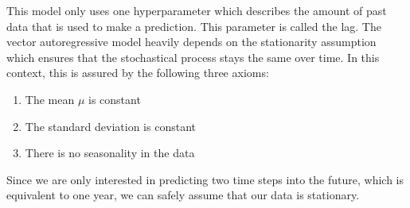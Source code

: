 \documentclass{article}
\theoremstyle{plain}
\theoremstyle{definition}
\theoremstyle{remark}
\begin{document}
This model only uses one hyperparameter which describes the amount of past data that is used to make a prediction. This parameter is called the lag.
The vector autoregressive model heavily depends on the stationarity assumption which ensures that the stochastical process stays the same over time. 
In this context, this is assured by the following three axioms:
\begin{enumerate}[label=\Roman*]
    \item The mean $\mu$ is constant
    \item The standard deviation is constant
    \item There is no seasonality in the data
\end{enumerate}
Since we are only interested in predicting two time steps into the future, which is equivalent to one year,
we can safely assume that our data is stationary.
\end{document}
